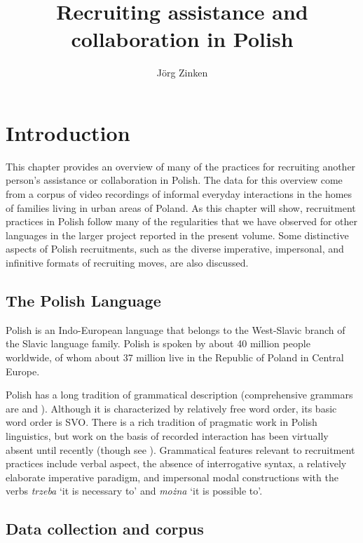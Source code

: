 \documentclass[output=paper]{langsci/langscibook}
\author{Jörg Zinken\affiliation{Department of Pragmatics, Leibniz-Institute for the German Language}}
\title{Recruiting assistance and collaboration in Polish}
\begin{document}
\section{Introduction}

This chapter provides an overview of many of the practices for recruiting another person's assistance or collaboration in Polish.  The data for this overview come from a corpus of video recordings of informal everyday interactions in the homes of families living in urban areas of Poland.  As this chapter will show, recruitment practices in Polish follow many of the regularities that we have observed for other languages in the larger project reported in the present volume.  Some distinctive aspects of Polish recruitments, such as the diverse imperative, impersonal, and infinitive formats of recruiting moves, are also discussed.

\subsection{The Polish Language}

Polish is an Indo-European language that belongs to the West-Slavic branch of the Slavic language family.  Polish is spoken by about 40 million people worldwide, of whom about 37 million live in the Republic of Poland in Central Europe.

Polish has a long tradition of grammatical description (comprehensive grammars are \citealt{bak2010} and \citealt{Strutyński2006}).  Although it is characterized by relatively free word order, its basic word order is SVO. There is a rich tradition of pragmatic work in Polish linguistics, but work on the basis of recorded interaction has been virtually absent until recently (though see \citealt{Labocha1985,Labocha1986}).  Grammatical features relevant to recruitment practices include verbal aspect, the absence of interrogative syntax, a relatively elaborate imperative paradigm, and impersonal modal constructions with the verbs \textit{trzeba} ‘it is necessary to’ and \textit{moż}\textit{na} ‘it is possible to’.

\subsection{Data collection and corpus}
\end{document}
